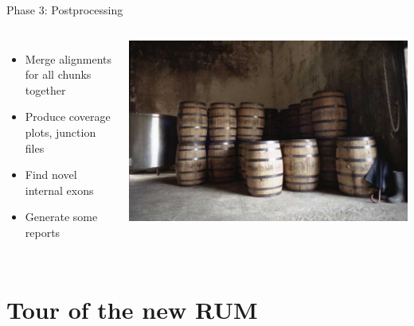 \documentclass{beamer}
\begin{document}
\begin{frame}{Phase 3: Postprocessing}

  \begin{columns}
    \column{2.5in}
    \begin{itemize}
    \item Merge alignments for all chunks together
    \item Produce coverage plots, junction files
    \item Find novel internal exons
    \item Generate some reports
    \end{itemize} 
    \column{2.5in}
    \includegraphics[scale=0.2]{Rum_in_barrels_at_travellers_distillery.jpg}
  \end{columns}
\end{frame}

\section{Tour of the new RUM}
\end{document}
